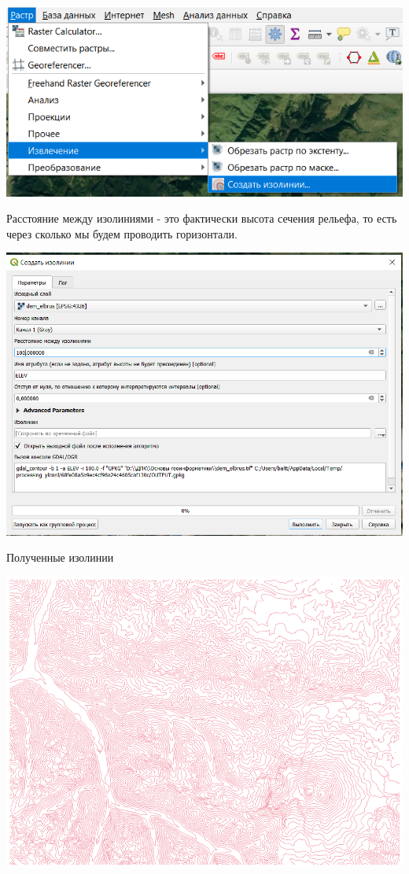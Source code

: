 \documentclass[
]{book}
\begin{document}
\includegraphics{figures/82.png}

Расстояние между изолиниями - это фактически высота сечения рельефа, то есть через сколько мы будем проводить горизонтали.

\includegraphics{figures/83.PNG}

Полученные изолинии

\includegraphics{figures/84.PNG}
\end{document}
